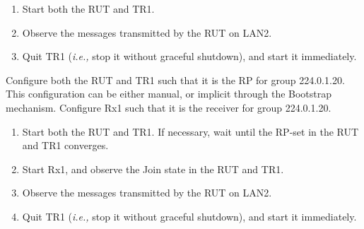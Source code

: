 \documentclass[11pt]{report}
\newcommand{\ie}{\emph{i.e.,}\xspace}
\begin{document}

\begin{enumerate}

  \item Start both the RUT and TR1.

  \item Observe the messages transmitted by the RUT on LAN2.

  \item Quit TR1 (\ie stop it without graceful shutdown), and start it
  immediately.

\end{enumerate}


Configure both the RUT and TR1 such that it is the RP for group
224.0.1.20. This configuration can be either manual, or implicit through the
Bootstrap mechanism. Configure Rx1 such that it is the receiver for group
224.0.1.20.

\begin{enumerate}

  \item Start both the RUT and TR1. If necessary, wait until the RP-set in the
  RUT and TR1 converges.

  \item Start Rx1, and observe the Join state in the RUT and TR1.

  \item Observe the messages transmitted by the RUT on LAN2.

  \item Quit TR1 (\ie stop it without graceful shutdown), and start it
  immediately.

\end{enumerate}


\end{document}
